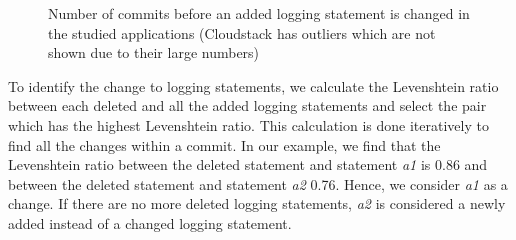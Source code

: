 





\begin{figure}[tb]
		\setlength{\belowcaptionskip}{-15pt}
	\centering
	\caption{Number of commits before an added logging statement is changed in the studied applications (Cloudstack has outliers which are not shown due to their large numbers)} 
	\label{fig:NumberofCommits}
\end{figure}


To identify the change to logging statements, we calculate the Levenshtein ratio between each deleted and all the added logging statements and select the pair which has the highest Levenshtein ratio. This calculation is done iteratively to find all the changes within a commit. In our example, we find that the Levenshtein ratio between the deleted statement and statement \emph{a1} is 0.86 and between the deleted statement and statement \emph{a2} 0.76. Hence, we consider \emph{a1} as a change. If there are no more deleted logging statements, \emph{a2} is considered a newly added instead of a changed logging statement. 


